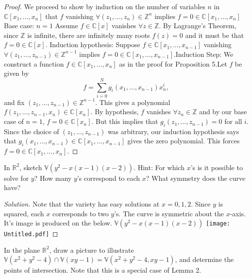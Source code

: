 \documentclass{article}
\newenvironment{problem}[2][Problem]{\begin{trivlist}
\item[\hskip \labelsep {\bfseries #1}\hskip \labelsep {\bfseries #2.}]}{\end{trivlist}}
\newenvironment{solution}{\begin{proof}[Solution]}{\end{proof}}
\begin{document}
\begin{proof}
We proceed to show by induction on the number of variables $n$ in $\mathbb{C}[x_1,\dots,x_n]$ that $f$ vanishing $\forall  (z_1,\dots, z_n) \in \mathbb{Z}^n$ implies $f = 0 \in \mathbb{C}[x_1, \dots, x_n]$ \newline Base case: $n=1$ \newline Assume $f \in \mathbb{C}[x]$ vanishes $\forall z \in \mathbb{Z}$.  By Lagrange's Theorem, since $\mathbb{Z}$ is infinite, there are infinitely many roots $f(z) = 0$  and it must be that $f = 0  \in \mathbb{C}[x]$. \newline Induction hypothesis: Suppose $f \in \mathbb{C}[x_1,\dots,x_{n-1}]$ vanishing $\forall (z_1, \dots, z_{n-1}) \in \mathbb{Z}^{n-1}$ implies $f = 0 \in \mathbb{C}[x_1,\dots,x_{n-1}]$.\newline Induction Step: We construct a function $f \in \mathbb{C}[x_1,\dots,x_n]$ as in the proof for Proposition 5.\newline Let $f$ be given by
$$f = \sum^N_{i=0}g_i(x_1, \dots, x_{n-1})x^i_n,$$
and fix $(z_1,\dots,z_{n-1}) \in \mathbb{Z}^{n-1}$. This gives a polynomial $f(z_1,\dots,z_{n-1},x_n) \in \mathbb{C}[x_n]$. By hypothesis, $f$ vanishes $\forall z_n \in \mathbb{Z}$ and by our base case of $n=1$, $f = 0 \in \mathbb{C}[x_n]$. But this implies that $g_i(z_1, \dots, z_{n-1}) = 0$ for all $i$. Since the choice of $(z_1, \dots, z_{n-1})$ was arbitrary, our induction hypothesis says that $g_i(x_1, \dots, x_{n-1}) \in \mathbb{C}[x_1,\dots,x_{n-1}]$ gives the zero polynomial. This forces $f = 0  \in \mathbb{C}[x_1, \dots, x_n]$.  
\end{proof}
\begin{problem}{(2)}
In $\mathbb{R}^2$, sketch $\mathbb{V}(y^2 - x(x - 1)(x - 2))$. Hint: For which $x$’s is it possible to solve for $y$?
How many $y$’s correspond to each $x$? What symmetry does the curve have?
\end{problem}
\begin{solution}
Note that the variety has easy solutions at $x = 0, 1, 2$.  Since $y$ is squared, each $x$ corresponds to two $y$'s.  The curve is symmetric about the $x$-axis. It's image is produced on the below. \newline
$\mathbb{V}(y^2 - x(x - 1)(x - 2))$ \newline
\texttt{[image: Untitled.pdf]}
\end{solution}
\newpage
\begin{problem}{(3)}
In the plane $\mathbb{R}^2$, draw a picture to illustrate
$\mathbb{V}(x^2 +y^2 -4)\cap\mathbb{V}(xy-1)=\mathbb{V}(x^2 +y^2 -4,xy-1)$,
and determine the points of intersection. Note that this is a special case of Lemma 2.
\end{problem}
\end{document}
